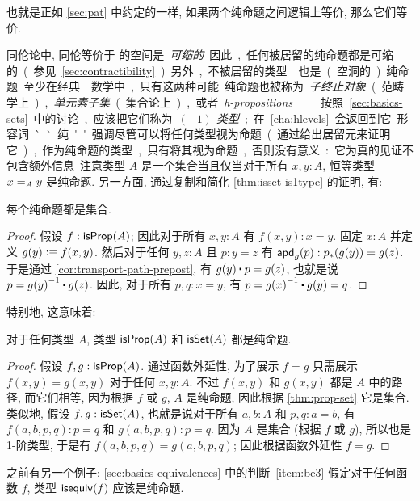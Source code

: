 也就是正如 \cref{sec:pat} 中约定的一样, 如果两个纯命题之间逻辑上等价, 那么它们等价.

同伦论中, 同伦等价于 \unit 的空间是\emph{可缩的}.
因此, 任何被居留的纯命题都是可缩的 (参见 \cref{sec:contractibility}).
另外, 不被居留的类型 \emptyt 也是 (空洞的) 纯命题.
至少在经典数学中, 只有这两种可能.

纯命题也被称为\emph{子终止对象} (范畴学上), \emph{单元素子集} (集合论上), 或者\emph{h-propositions}.
%
%
%
按照 \cref{sec:basics-sets} 中的讨论, 应该把它们称为 \emph{$(-1)$-类型}; 在 \cref{cha:hlevels} 会返回到它.
形容词 ``纯'' 强调尽管可以将任何类型视为命题 (通过给出居留元来证明它), 作为纯命题的类型, 只有将其视为命题, 否则没有意义: 它为真的见证不包含额外信息.

注意类型 $A$ 是一个集合当且仅当对于所有 $x,y:A$, 恒等类型 $\id[A]xy$ 是纯命题.
另一方面, 通过复制和简化 \cref{thm:isset-is1type} 的证明, 有:

\begin{lem}\label{thm:prop-set}
  每个纯命题都是集合.
\end{lem}
\begin{proof}
  假设 $f:\isprop(A)$; 因此对于所有 $x,y:A$ 有 $f(x,y):x=y$.
  固定 $x:A$ 并定义 $g(y)\defeq f(x,y)$.
  然后对于任何 $y,z:A$ 且 $p:y=z$ 有 $\apd g p : \trans{p}{g(y)}={g(z)}$.
  于是通过 \cref{cor:transport-path-prepost}, 有 $g(y)\ct p = g(z)$, 也就是说 $p=\opp{g(y)}\ct g(z)$.
  因此, 对于所有 $p,q:x=y$, 有 $p = \opp{g(x)}\ct g(y) = q$.
\end{proof}

特别地, 这意味着:

\begin{lem}\label{thm:isprop-isprop}\label{thm:isprop-isset}
  对于任何类型 $A$, 类型 $\isprop(A)$ 和 $\isset(A)$ 都是纯命题.
\end{lem}
\begin{proof}
  假设 $f,g:\isprop(A)$.
  通过函数外延性, 为了展示 $f=g$ 只需展示 $f(x,y)=g(x,y)$ 对于任何 $x,y:A$.
  不过 $f(x,y)$ 和 $g(x,y)$ 都是 $A$ 中的路径, 而它们相等, 因为根据 $f$ 或 $g$, $A$ 是纯命题, 因此根据 \cref{thm:prop-set} 它是集合.
  类似地, 假设 $f,g:\isset(A)$, 也就是说对于所有 $a,b:A$ 和 $p,q:a=b$, 有 $f(a,b,p,q):p=q$ 和 $g(a,b,p,q):p=q$.
  因为 $A$ 是集合 (根据 $f$ 或 $g$), 所以也是 1-阶类型, 于是有 $f(a,b,p,q)=g(a,b,p,q)$;
  因此根据函数外延性 $f=g$.
\end{proof}

之前有另一个例子: \cref{sec:basics-equivalences} 中的判断~\ref{item:be3} 假定对于任何函数 $f$, 类型 $\isequiv (f)$ 应该是纯命题.

%
%
